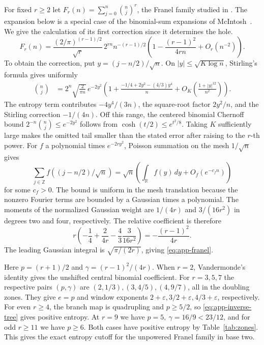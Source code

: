 \documentclass[11pt,reqno,a4paper]{amsart}
\theoremstyle{remark}
\begin{document}
For fixed \(r\ge2\) let \(F_r(n)=\sum_{j=0}^n\binom nj^r\), the
Franel family studied in \cite{app-straub-zudilin}. The expansion
below is a special case of the binomial-sum expansions of
McIntosh~\cite{app-mcintosh}. We give the calculation of its first
correction since it determines the hole.
\begin{equation}\label{eq:app-franel}
 F_r(n)=
 \frac{(2/\pi)^{(r-1)/2}}{\sqrt r}\,
 2^{rn} n^{-(r-1)/2}
 \left(1-\frac{(r-1)^2}{4rn}+O_r(n^{-2})\right).
\end{equation}
To obtain the correction, put \(y=(j-n/2)/\sqrt n\).
On \(|y|\le\sqrt{K\log n}\), Stirling's formula gives uniformly
\begin{align*}
 \binom nj
 &=2^n\sqrt{\frac{2}{\pi n}}\,e^{-2y^2}
 \left(1+\frac{-1/4+2y^2-(4/3)y^4}{n}
          +O_K\!\left(\frac{1+|y|^{12}}{n^2}\right)\right).
\end{align*}
The entropy term contributes \(-4y^4/(3n)\), the square-root
factor \(2y^2/n\), and the Stirling correction \(-1/(4n)\).
Off this range, the centered binomial Chernoff bound
\(2^{-n}\binom nj\le e^{-2y^2}\) follows from
\(\cosh(t/2)\le e^{t^2/8}\).
Taking \(K\) sufficiently large makes the omitted tail smaller
than the stated error after raising to the \(r\)-th power.
For \(f\) a polynomial times \(e^{-2ry^2}\), Poisson summation on
the mesh \(1/\sqrt n\) gives
\[
 \sum_{j\in\mathbb Z} f((j-n/2)/\sqrt n)
   =\sqrt n\left(\int_{\mathbb R} f(y)\,dy+O_f(e^{-c_f n})\right)
\]
for some \(c_f>0\). The bound is uniform in the mesh translation
because the nonzero Fourier terms are bounded by a Gaussian
times a polynomial. The moments of the normalized
Gaussian weight are \(1/(4r)\) and \(3/(16r^2)\) in degrees two
and four, respectively. The relative coefficient is therefore
\[
 r\left(-\frac14+\frac{2}{4r}-\frac43\frac{3}{16r^2}\right)
 =-\frac{(r-1)^2}{4r}.
\]
The leading Gaussian integral is \(\sqrt{\pi/(2r)}\), giving
\eqref{eq:app-franel}.

Here \(p=(r+1)/2\) and \(\gamma=(r-1)^2/(4r)\).
When \(r=2\), Vandermonde's identity gives the unshifted central
binomial coefficient. For \(r=3,5,7\) the respective pairs
\((p,\gamma)\) are \((2,1/3),(3,4/5),(4,9/7)\), all in the
doubling zones. They give \(e=p\) and window exponents
\(2+\varepsilon,3/2+\varepsilon,4/3+\varepsilon\), respectively.
For even \(r\ge4\), the branch map is quadrupling and \(p\ge5/2\),
so \eqref{eq:app-inverse-tree} gives positive entropy. At
\(r=9\) we have \(p=5,\ \gamma=16/9<23/12\), and for odd \(r\ge11\)
we have \(p\ge6\). Both cases have positive entropy by
Table~\ref{tab:zones}. This gives the exact entropy cutoff for
the unpowered Franel family in base two.
\end{document}

